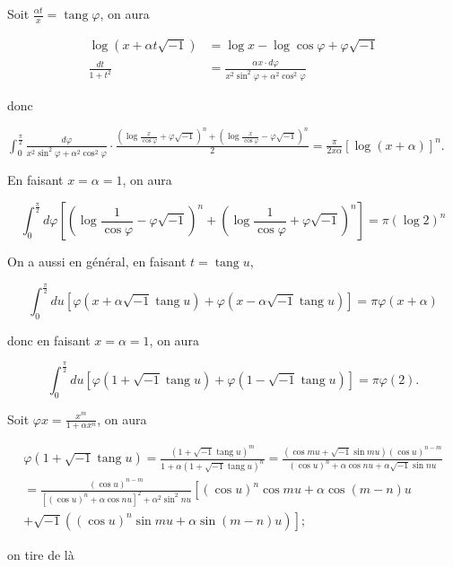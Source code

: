 \documentclass{article}
\begin{document}
Soit \(\frac{\alpha t}{x}=\operatorname{tang} \varphi\), on aura

\[
\begin{aligned}
\log (x+\alpha t \sqrt{-1}) & =\log x-\log \cos \varphi+\varphi \sqrt{-1} \\
\frac{d t}{1+t^{2}} & =\frac{\alpha x \cdot d \varphi}{x^{2} \sin ^{2} \varphi+\alpha^{2} \cos ^{2} \varphi}
\end{aligned}
\]

donc

\(\int_{0}^{\frac{\pi}{2}} \frac{d \varphi}{x^{2} \sin ^{2} \varphi+\alpha^{2} \cos ^{2} \varphi} \cdot \frac{\left(\log \frac{x}{\cos \varphi}+\varphi \sqrt{-1}\right)^{n}+\left(\log \frac{x}{\cos \varphi}-\varphi \sqrt{-1}\right)^{n}}{2}=\frac{\pi}{2 x \alpha}[\log (x+\alpha)]^{n}\).

En faisant \(x=\alpha=1\), on aura

\[
\int_{0}^{\frac{\pi}{2}} d \varphi\left[\left(\log \frac{1}{\cos \varphi}-\varphi \sqrt{-1}\right)^{n}+\left(\log \frac{1}{\cos \varphi}+\varphi \sqrt{-1}\right)^{n}\right]=\pi(\log 2)^{n}
\]

On a aussi en général, en faisant \(t=\operatorname{tang} u\),

\[
\int_{0}^{\frac{\pi}{2}} d u[\varphi(x+\alpha \sqrt{-1} \operatorname{tang} u)+\varphi(x-\alpha \sqrt{-1} \operatorname{tang} u)]=\pi \varphi(x+\alpha)
\]

donc en faisant \(x=\alpha=1\), on aura

\[
\int_{0}^{\frac{\pi}{2}} d u[\varphi(1+\sqrt{-1} \operatorname{tang} u)+\varphi(1-\sqrt{-1} \operatorname{tang} u)]=\pi \varphi(2) .
\]

Soit \(\varphi x=\frac{x^{m}}{1+\alpha x^{n}}\), on aura

\[
\begin{gathered}
\varphi(1+\sqrt{-1} \operatorname{tang} u)=\frac{(1+\sqrt{-1} \operatorname{tang} u)^{m}}{1+\alpha(1+\sqrt{-1} \operatorname{tang} u)^{n}}=\frac{(\cos m u+\sqrt{-1} \sin m u)(\cos u)^{n-m}}{(\cos u)^{n}+\alpha \cos n u+\alpha \sqrt{-1} \sin n u} \\
=\frac{(\cos u)^{n-m}}{\left[(\cos u)^{n}+\alpha \cos n u\right]^{2}+\alpha^{2} \sin ^{2} n u}\left[(\cos u)^{n} \cos m u+\alpha \cos (m-n) u\right. \\
\left.+\sqrt{-1}\left((\cos u)^{n} \sin m u+\alpha \sin (m-n) u\right)\right] ;
\end{gathered}
\]

on tire de là
\end{document}
